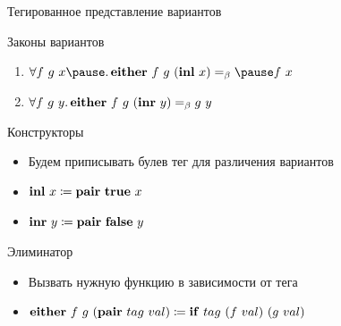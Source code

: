     \begin{frame}[fragile]{Тегированное представление вариантов}
        \begin{block}{Законы вариантов}
            \begin{enumerate}
                \item $\forall f~g~x \pause \ldotp \term{either} \ap f \ap g \ap (\term{inl} \ap x) \eqbeta \pause f \ap x$
                \item $\forall f~g~y \ldotp \mathbf{either} ~ f ~ g ~ (\mathbf{inr} ~ y) =_\beta g ~ y$
            \end{enumerate}
        \end{block}
        \pause
        \begin{block}{Конструкторы}
            \begin{itemize}
                \item Будем приписывать булев тег для различения вариантов
                \item $\mathbf{inl} ~ x \coloneqq \mathbf{pair} ~ \mathbf{true} ~ x$
                \item $\mathbf{inr} ~ y \coloneqq \mathbf{pair} ~ \mathbf{false} ~ y$
            \end{itemize}
        \end{block}
        \pause
        \begin{block}{Элиминатор}
            \begin{itemize}
                \item Вызвать нужную функцию в зависимости от тега
                \item $\mathbf{either} ~ f ~ g ~ (\mathbf{pair} ~ tag ~ val) \coloneqq \mathbf{if} ~ tag ~ (f ~ val) ~ (g ~ val)$
            \end{itemize}
        \end{block}
    \end{frame}


